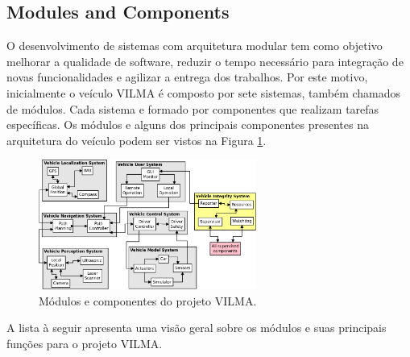 \documentclass[conference]{IEEEtran}
\begin{document}
%
\subsection{Modules and Components}\label{subsec:modules_components}
O desenvolvimento de sistemas com arquitetura modular tem como objetivo melhorar a qualidade de software, reduzir o tempo necessário para integração de novas funcionalidades e agilizar a entrega dos trabalhos. Por este motivo, inicialmente o veículo VILMA é composto por sete sistemas, também chamados de módulos. Cada sistema e formado por componentes que realizam tarefas específicas. Os módulos e alguns dos principais componentes presentes na arquitetura do veículo podem ser vistos na Figura \ref{fig:VILMA_MODULES_COMPONENTS}.

\begin{figure}[h]
	\centering
	\includegraphics[width=270px,keepaspectratio]{imagens/VILMA_MODULES_COMPONENTS}
	\caption{Módulos e componentes do projeto VILMA.}
	\label{fig:VILMA_MODULES_COMPONENTS}
\end{figure}

A lista à seguir apresenta uma visão geral sobre os módulos e suas principais funções para o projeto VILMA.
\end{document}
